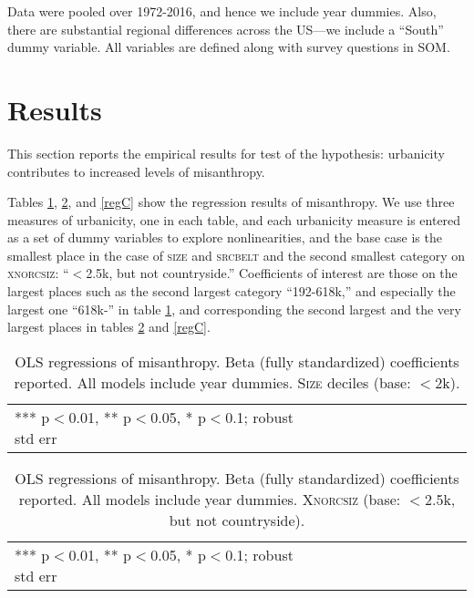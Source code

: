 \documentclass[11pt, letterpaper]{article}
\begin{document}
\begin{spacing}{1.4}
Data were pooled over 1972-2016, and hence we include year dummies. Also, there
are substantial regional differences across the US---we include a ``South'' dummy variable. All variables are defined along with survey questions in SOM.

\section*{Results}

This section reports the empirical results for test of the hypothesis:
 urbanicity contributes to increased levels of misanthropy.

Tables \ref{regA}, \ref{regB}, and \ref{regC} show the regression results of misanthropy. We use three measures of
urbanicity, one in each table,  and each urbanicity measure is entered as a set of dummy variables to
explore nonlinearities, and the base case is the smallest place in the case of
\textsc{size} and \textsc{srcbelt} and the second smallest category on \textsc{xnorcsiz}:
 ``$<$2.5k, but not countryside.'' Coefficients of interest are those on the
 largest  places such as the second largest category ``192-618k,'' and especially the largest one ``618k-'' in table
\ref{regA}, and corresponding the second largest and the very largest places in tables
\ref{regB} and \ref{regC}.

\begin{table}[h!]\centering
\caption{OLS regressions  of misanthropy. Beta (fully standardized) coefficients
  reported. All models include year dummies. \textsc{Size} deciles (base: $<$2k).} \label{regA}
\begin{scriptsize} \begin{tabular}{p{1.8in}p{.45in}p{.45in}p{.45in}p{.45in}p{.45in}p{.45in}p{.45in}p{.45in}p{.45in}p{.45 in}}\hline

\hline  *** p$<$0.01, ** p$<$0.05, * p$<$0.1; robust std err
\end{tabular}\end{scriptsize}\end{table}

\begin{table}[h!]\centering
\caption{OLS regressions  of misanthropy. Beta (fully standardized) coefficients
  reported. All models include year dummies.  \textsc{Xnorcsiz} (base: $<$2.5k, but not countryside).} \label{regB}
\begin{scriptsize} \begin{tabular}{p{1.8in}p{.45in}p{.45in}p{.45in}p{.45in}p{.45in}p{.45in}p{.45in}p{.45in}p{.45in}p{.45 in}}\hline

\hline  *** p$<$0.01, ** p$<$0.05, * p$<$0.1; robust std err
\end{tabular}\end{scriptsize}\end{table}


\end{spacing}
\end{document}
